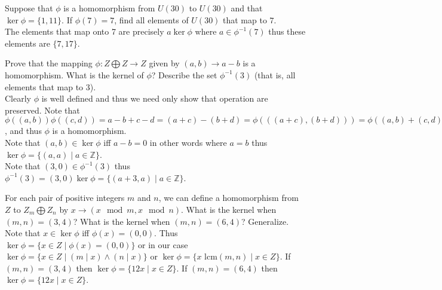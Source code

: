 \documentclass[12pt]{article}
\makeatletter
\theoremstyle{homework}
\newenvironment{exercise}[1]
{\def\@currentlabel{#1}\exercisecore}
{\endexercisecore}
\makeatother
\begin{document}
\begin{exercise}{10.31}
Suppose that $\phi$ is a homomorphism from $U(30)$ to $U(30)$ and that $\ker \phi = \{1, 11\}$. If $\phi(7) = 7$, find all elements of $U(30)$ that map to $7$.\\
The elements that map onto 7 are precisely $a\ker\phi$ where $a\in \phi^{-1}(7)$ thus these elements are $\{7,17\}$.
\end{exercise}

\begin{exercise}{10.35}
Prove that the mapping $\phi: Z \bigoplus Z \rightarrow Z$ given by $(a, b) \rightarrow a - b$ is a homomorphism. What is the kernel of $\phi$? Describe the set $\phi^{-1} (3)$ (that is, all elements that map to 3).\\
Clearly $\phi$ is well defined and thus we need only show that operation are preserved.  Note that $\phi((a,b))\phi((c,d))=a-b+c-d=(a+c)-(b+d)=\phi(((a+c),(b+d)))=\phi((a,b)+(c,d))$, and thus $\phi$ is a homomorphism.\\
Note that $(a,b)\in\ker\phi$ iff $a-b=0$ in other words where $a=b$ thus $\ker\phi =\{ (a,a)\mid a\in\mathbb{Z}\}$.\\
Note that $(3,0)\in\phi^{-1}(3)$ thus $\phi^{-1}(3)=(3,0)\ker\phi=\{ (a+3,a)\mid a\in\mathbb{Z}\}$.
\end{exercise}

\begin{exercise}{10.40}
For each pair of positive integers $m$ and $n$, we can define a homomorphism from $Z$ to $Z_m \bigoplus Z_n$ by $x \rightarrow (x \mod m, x \mod n)$. What is the kernel when $(m, n) = (3, 4)$? What is the kernel when $(m, n) = (6, 4)$? Generalize.\\
Note that $x\in\ker\phi$ iff $\phi(x)=(0,0)$.  Thus $\ker\phi=\{x\in Z\mid \phi(x)=(0,0)\}$ or in our case $\ker\phi=\{x\in Z\mid (m\mid x)\wedge(n\mid x) \}$ or $\ker\phi=\{x\text{ lcm}(m,n)\mid x\in Z\}$.  If $(m, n) = (3, 4)$ then $\ker\phi=\{12x\mid x\in Z\}$.  If $(m, n) = (6, 4)$ then $\ker\phi=\{12x\mid x\in Z\}$.
\end{exercise}
\end{document}
